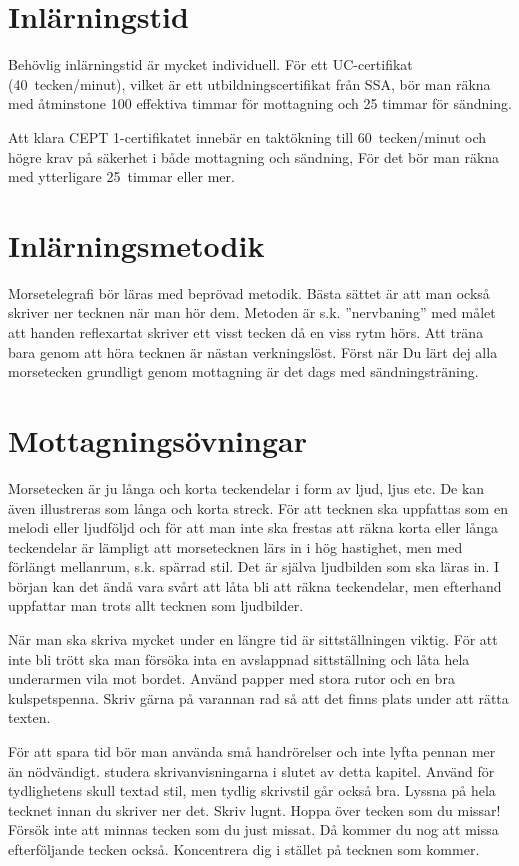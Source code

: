 \section{Inlärningstid}

Behövlig inlärningstid är mycket individuell.
För ett UC-certifikat (40~tecken/minut), vilket är ett utbildningscertifikat
från SSA, bör man räkna med åtminstone 100 effektiva timmar för mottagning
och 25 timmar för sändning.

Att klara CEPT 1-certifikatet innebär en taktökning till 60~tecken/minut och
högre krav på säkerhet i både mottagning och sändning, För det bör man räkna med
ytterligare 25~timmar eller mer.

\section{Inlärningsmetodik}

Morsetelegrafi bör läras med beprövad metodik. Bästa sättet är att man också
skriver ner tecknen när man hör dem. Metoden är s.k. ''nervbaning'' med målet att
handen reflexartat skriver ett visst tecken då en viss rytm hörs. Att träna bara
genom att höra tecknen är nästan verkningslöst. Först när Du lärt dej alla
morsetecken grundligt genom mottagning är det dags med sändningsträning.

\section{Mottagnings\-övningar}

Morsetecken är ju långa och korta teckendelar i form av ljud, ljus etc. De kan
även illustreras som långa och korta streck. För att tecknen ska uppfattas som
en melodi eller ljudföljd och för att man inte ska frestas att räkna korta
eller långa teckendelar är lämpligt att morsetecknen lärs in i hög hastighet,
men med förlängt mellanrum, s.k. spärrad stil. Det är själva ljudbilden som
ska läras in. I början kan det ändå vara svårt att låta bli att räkna
teckendelar, men efterhand uppfattar man trots allt tecknen som ljudbilder.

När man ska skriva mycket under en längre tid är sittställningen viktig. För
att inte bli trött ska man försöka inta en avslappnad sittställning och låta
hela underarmen vila mot bordet. Använd papper med stora rutor och en bra
kulspetspenna. Skriv gärna på varannan rad så att det finns plats under att
rätta texten.

För att spara tid bör man använda små handrörelser och inte lyfta pennan mer än
nödvändigt. studera skrivanvisningarna i slutet av detta kapitel. Använd för
tydlighetens skull textad stil, men tydlig skrivstil går också bra. Lyssna på
hela tecknet innan du skriver ner det. Skriv lugnt. Hoppa över tecken som du
missar! Försök inte att minnas tecken som du just missat. Då kommer du nog att
missa efterföljande tecken också. Koncentrera dig i stället på tecknen som
kommer.

